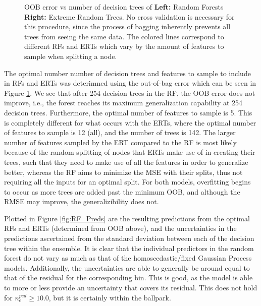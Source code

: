 \documentclass[a4paper, twoside, final, 12pt]{article}
\begin{document}
{\begin{figure}[h]
\begin{subfigure}{0.5\linewidth}
	\end{subfigure}
	\caption{OOB error vs number of decision trees of \textbf{Left:} Random Forests \textbf{Right:} Extreme Random Trees. No cross validation is necessary for this procedure, since the process of bagging inherently prevents all trees from seeing the same data. The colored lines correspond to different RFs and ERTs which vary by the amount of features to sample when splitting a node.}
	\label{fig:RF_exp}
\end{figure}
The optimal number number of decision trees and features to sample to include in RFs and ERTs was deterimned using the out-of-bag error which can be seen in Figure \ref{fig:RF_exp}. We see that after 254 decision trees in the RF, the OOB error does not improve, i.e., the forest reaches its maximum generalization capability at 254 decision trees. Furthermore, the optimal number of features to sample is 5. This is completely different for what occurs with the ERTs, where the optimal number of features to sample is 12 (all), and the number of trees is 142. The larger number of features sampled by the ERT compared to the RF is most likely because of the random splitting of nodes that ERTs make use of in creating their trees, such that they need to make use of all the features in order to generalize better, whereas the RF aims to minimize the MSE with their splits, thus not requiring all the inputs for an optimal split. For both models, overfitting begins to occur as more trees are added past the minimum OOB, and although the RMSE may improve, the generalizibility does not.


Plotted in Figure \ref{fig:RF_Preds} are the resulting predictions from the optimal RFs and ERTs (determined from OOB above), and the uncertainties in the predictions ascertained from the standard deviation between each of the decision tree within the ensemble.
It is clear that the individual predictors in the random forest do not vary as much as that of the homoscedastic/fixed Gaussian Process models. 
Additionally, the uncertainties are able to generally be around equal to that of the residual for the corresponding bin. This is good, as the model is able to more or less provide an uncertainty that covers its residual. This does not hold for $n_e^{ped} \geq 10.0$, but it is certainly within the ballpark. 

}
\end{document}
